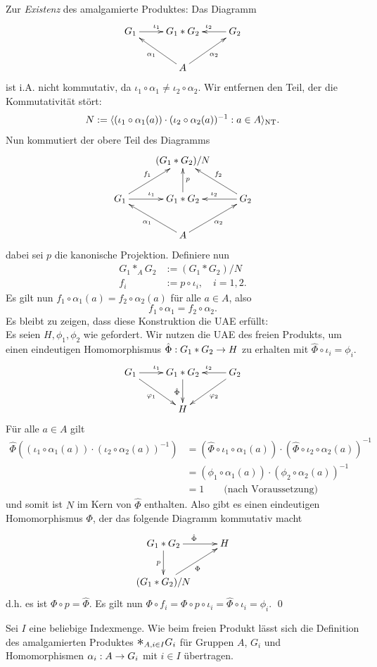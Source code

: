 \documentclass[a4paper, 12pt, twoside]{article}
\begin{document}
Zur \textsl{Existenz} des amalgamierte Produktes:
Das Diagramm
\[\xymatrix{
G_1 \ar[r]^{\iota_1}  &
	G_1* G_2 &
	G_2 \ar[l]_{\iota_2}\\
& A \ar[ul]^{\alpha_1} \ar[ur]_{\alpha_2}  &
}\]
ist i.A. nicht kommutativ, da
$\iota_1\circ\alpha_1\neq\iota_2\circ\alpha_2$.
Wir entfernen den Teil, der die Kommutativität stört:
\[
N :=
\langle (\iota_1\circ\alpha_1(a))\cdot(\iota_2\circ\alpha_2(a))^{-1}
:a\in A \rangle_{\mathrm{NT}}.
\]
Nun kommutiert der obere Teil des Diagramms
\[\xymatrix{
& (G_1*G_2)/N & \\
G_1 \ar[r]^{\iota_1} \ar[ur]^{f_1}  &
	G_1* G_2 \ar[u]_{p} &
	G_2 \ar[l]_{\iota_2} \ar[ul]_{f_2} \\
& A \ar[ul]^{\alpha_1} \ar[ur]_{\alpha_2}  &
}\]
dabei sei $p$ die kanonische Projektion. Definiere nun
\begin{align*}
G_1 *_A G_2 &:= (G_1*G_2)/N \\
f_i &:= p\circ \iota_i, \quad i=1,2.
\end{align*}
Es gilt nun
$f_1\circ\alpha_1(a) = f_2\circ\alpha_2(a)$ für alle $a\in A$,
also
\[
f_1\circ\alpha_1 = f_2\circ\alpha_2.
\]
Es bleibt zu zeigen, dass diese Konstruktion die UAE erfüllt:\\
Es seien $H,\phi_1,\phi_2$ wie gefordert. Wir nutzen die UAE
des freien Produkts, um einen eindeutigen Homomorphismus
$\hat{\Phi}:G_1*G_2\rightarrow H$ zu erhalten mit
$\hat{\Phi}\circ\iota_i=\phi_i$.
\[\xymatrix{
G_1 \ar[r]^{\iota_1} \ar[dr]_{\phi_1} &
	G_1 * G_2 \ar[d]_{\hat{\Phi}} &
	G_2 \ar[l]_{\iota_2} \ar[dl]^{\phi_2} \\
& H &
}\]
Für alle $a\in A$ gilt
\begin{align*}
\hat{\Phi}((\iota_1\circ\alpha_1(a))\cdot(\iota_2\circ\alpha_2(a))^{-1})
&= (\hat{\Phi}\circ\iota_1\circ\alpha_1(a))
\cdot (\hat{\Phi}\circ\iota_2\circ\alpha_2(a))^{-1} \\
&= (\phi_1\circ\alpha_1(a))\cdot(\phi_2\circ\alpha_2(a))^{-1} \\
&= 1 \qquad\text{(nach Voraussetzung)}
\end{align*}
und somit ist $N$ im Kern von $\hat{\Phi}$ enthalten.
Also gibt es einen eindeutigen Homomorphismus $\Phi$, der das
folgende Diagramm kommutativ macht
\[\xymatrix{
G_1 * G_2 \ar[d]_{p} \ar[r]^{\hat{\Phi}} & H \\
(G_1*G_2)/N \ar[ur]_{\Phi}
}\]
d.h. es ist $\Phi\circ p=\hat{\Phi}$.
Es gilt nun
$\Phi\circ f_i = \Phi\circ p\circ \iota_i=\hat{\Phi}\circ\iota_i
=\phi_i$.
\qed

\BEM Sei $I$ eine beliebige Indexmenge.
Wie beim freien Produkt lässt sich die Definition des
amalgamierten Produktes $\text{\Large$*$}_{A,i\in I} G_i$ für Gruppen $A$, $G_i$
und Homomorphismen $\alpha_i:A\rightarrow G_i$ mit
$i\in I$ übertragen.
\end{document}
